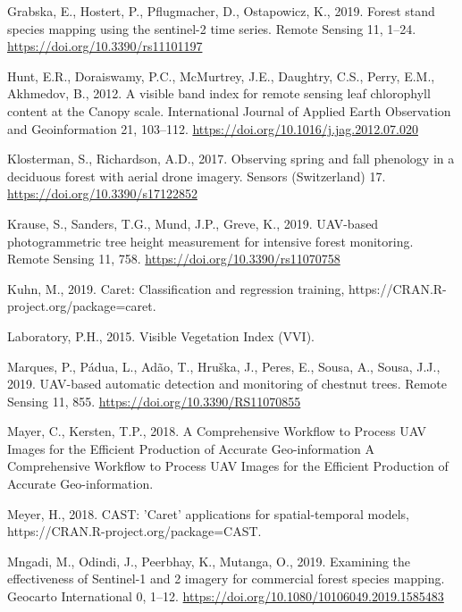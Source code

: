 \documentclass[]{article}
\begin{document}
\leavevmode\hypertarget{ref-Grabska2019}{}%
Grabska, E., Hostert, P., Pflugmacher, D., Ostapowicz, K., 2019. Forest
stand species mapping using the sentinel-2 time series. Remote Sensing
11, 1--24. \url{https://doi.org/10.3390/rs11101197}

\leavevmode\hypertarget{ref-Hunt2012}{}%
Hunt, E.R., Doraiswamy, P.C., McMurtrey, J.E., Daughtry, C.S., Perry,
E.M., Akhmedov, B., 2012. A visible band index for remote sensing leaf
chlorophyll content at the Canopy scale. International Journal of
Applied Earth Observation and Geoinformation 21, 103--112.
\url{https://doi.org/10.1016/j.jag.2012.07.020}

\leavevmode\hypertarget{ref-Klosterman2017}{}%
Klosterman, S., Richardson, A.D., 2017. Observing spring and fall
phenology in a deciduous forest with aerial drone imagery. Sensors
(Switzerland) 17. \url{https://doi.org/10.3390/s17122852}

\leavevmode\hypertarget{ref-Krause2019a}{}%
Krause, S., Sanders, T.G., Mund, J.P., Greve, K., 2019. UAV-based
photogrammetric tree height measurement for intensive forest monitoring.
Remote Sensing 11, 758. \url{https://doi.org/10.3390/rs11070758}

\leavevmode\hypertarget{ref-R-caret}{}%
Kuhn, M., 2019. Caret: Classification and regression training,
https://CRAN.R-project.org/package=caret.

\leavevmode\hypertarget{ref-Laboratory2015}{}%
Laboratory, P.H., 2015. Visible Vegetation Index (VVI).

\leavevmode\hypertarget{ref-Marques2019a}{}%
Marques, P., Pádua, L., Adão, T., Hruška, J., Peres, E., Sousa, A.,
Sousa, J.J., 2019. UAV-based automatic detection and monitoring of
chestnut trees. Remote Sensing 11, 855.
\url{https://doi.org/10.3390/RS11070855}

\leavevmode\hypertarget{ref-Mayer2018}{}%
Mayer, C., Kersten, T.P., 2018. A Comprehensive Workflow to Process UAV
Images for the Efficient Production of Accurate Geo-information A
Comprehensive Workflow to Process UAV Images for the Efficient
Production of Accurate Geo-information.

\leavevmode\hypertarget{ref-R-CAST}{}%
Meyer, H., 2018. CAST: 'Caret' applications for spatial-temporal models,
https://CRAN.R-project.org/package=CAST.

\leavevmode\hypertarget{ref-Mngadi2019}{}%
Mngadi, M., Odindi, J., Peerbhay, K., Mutanga, O., 2019. Examining the
effectiveness of Sentinel-1 and 2 imagery for commercial forest species
mapping. Geocarto International 0, 1--12.
\url{https://doi.org/10.1080/10106049.2019.1585483}
\end{document}
